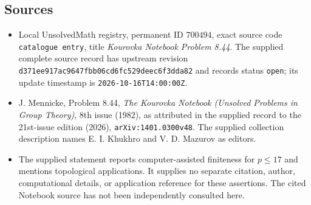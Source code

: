 \documentclass[11pt]{article}
\begin{document}
\subsection{Sources}
\begin{itemize}
\item Local UnsolvedMath registry, permanent ID \(700494\), exact source code \texttt{catalogue entry}, title \emph{Kourovka Notebook Problem 8.44}. The supplied complete source record has upstream revision \texttt{d371ee917ac9647fbb06cd6fc529deec6f3dda82} and records status \texttt{open}; its update timestamp is \texttt{2026-10-16T14:00:00Z}.
\item J. Mennicke, Problem 8.44, \emph{The Kourovka Notebook (Unsolved Problems in Group Theory)}, 8th issue (1982), as attributed in the supplied record to the 21st-issue edition (2026), \texttt{arXiv:1401.0300v48}. The supplied collection description names E. I. Khukhro and V. D. Mazurov as editors.
\item The supplied statement reports computer-assisted finiteness for \(p\leq17\) and mentions topological applications. It supplies no separate citation, author, computational details, or application reference for these assertions. The cited Notebook source has not been independently consulted here.
\end{itemize}
\end{document}
